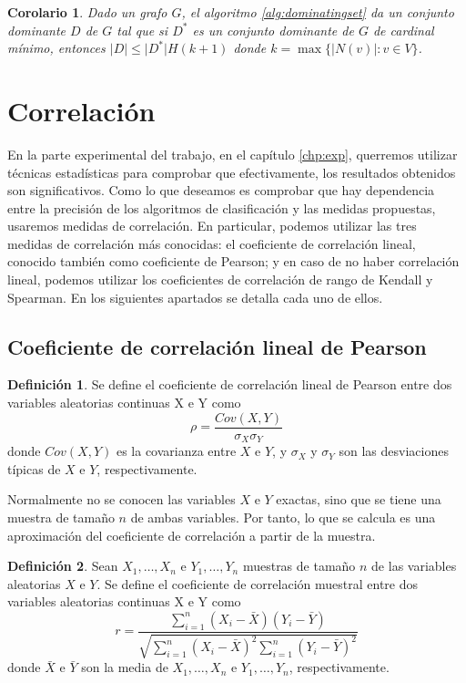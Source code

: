 \documentclass[a4paper,12pt]{report}
\newtheorem{corollary}{Corolario}
\theoremstyle{definition}
\newtheorem{dfn}{Definición}
\begin{document}
\begin{corollary}
  Dado un grafo $G$, el algoritmo \ref{alg:dominatingset} da un conjunto dominante $D$ de $G$ tal que si $D^*$ es un conjunto dominante de $G$ de cardinal mínimo, entonces $\lvert D \rvert \leq \lvert D^* \rvert H(k+1)$ donde $k = \max \lbrace \lvert N(v) \rvert : v \in V \rbrace$.
\end{corollary}

\section{Correlación}
\label{sec:cor}
En la parte experimental del trabajo, en el capítulo \ref{chp:exp}, querremos utilizar técnicas estadísticas para comprobar que efectivamente, los resultados obtenidos son significativos. Como lo que deseamos es comprobar que hay dependencia entre la precisión de los algoritmos de clasificación y las medidas propuestas, usaremos medidas de correlación\cite{dodge2008concise}. En particular, podemos utilizar las tres medidas de correlación más conocidas: el coeficiente de correlación lineal, conocido también como coeficiente de Pearson; y en caso de no haber correlación lineal, podemos utilizar los coeficientes de correlación de rango de Kendall y Spearman. En los siguientes apartados se detalla cada uno de ellos.

\subsection{Coeficiente de correlación lineal de Pearson}

\begin{dfn}
  Se define el coeficiente de correlación lineal de Pearson entre dos variables aleatorias continuas X e Y como
  $$ \rho = \frac{Cov(X,Y)}{\sigma_X \sigma_Y} $$
  donde $Cov(X,Y)$ es la covarianza entre $X$ e $Y$, y $\sigma_X$ y $\sigma_Y$ son las desviaciones típicas de $X$ e $Y$, respectivamente.
\end{dfn}

Normalmente no se conocen las variables $X$ e $Y$ exactas, sino que se tiene una muestra de tamaño $n$ de ambas variables. Por tanto, lo que se calcula es una aproximación del coeficiente de correlación a partir de la muestra.

\begin{dfn}
  Sean $X_1, \ldots, X_n$ e $Y_1, \ldots, Y_n$ muestras de tamaño $n$ de las variables aleatorias $X$ e $Y$. Se define el coeficiente de correlación muestral entre dos variables aleatorias continuas X e Y como
  $$ r = \frac{\displaystyle \sum_{i=1}^n(X_i-\bar{X})(Y_i-\bar{Y})}{\displaystyle \sqrt{\sum_{i=1}^n(X_i-\bar{X})^2\sum_{i=1}^n(Y_i-\bar{Y})^2}}$$
  donde $\bar{X}$ e $\bar{Y}$ son la media de $X_1, \ldots, X_n$ e $Y_1, \ldots, Y_n$, respectivamente.
\end{dfn}
\end{document}
